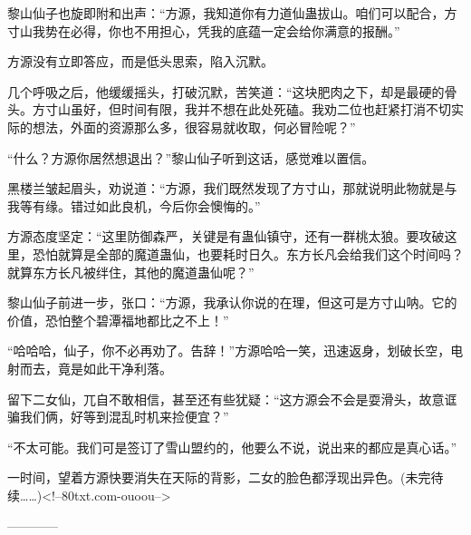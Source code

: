 \begin{this_body}
黎山仙子也旋即附和出声：“方源，我知道你有力道仙蛊拔山。咱们可以配合，方寸山我势在必得，你也不用担心，凭我的底蕴一定会给你满意的报酬。”

方源没有立即答应，而是低头思索，陷入沉默。

几个呼吸之后，他缓缓摇头，打破沉默，苦笑道：“这块肥肉之下，却是最硬的骨头。方寸山虽好，但时间有限，我并不想在此处死磕。我劝二位也赶紧打消不切实际的想法，外面的资源那么多，很容易就收取，何必冒险呢？”

“什么？方源你居然想退出？”黎山仙子听到这话，感觉难以置信。

黑楼兰皱起眉头，劝说道：“方源，我们既然发现了方寸山，那就说明此物就是与我等有缘。错过如此良机，今后你会懊悔的。”

方源态度坚定：“这里防御森严，关键是有蛊仙镇守，还有一群桃太狼。要攻破这里，恐怕就算是全部的魔道蛊仙，也要耗时日久。东方长凡会给我们这个时间吗？就算东方长凡被绊住，其他的魔道蛊仙呢？”

黎山仙子前进一步，张口：“方源，我承认你说的在理，但这可是方寸山呐。它的价值，恐怕整个碧潭福地都比之不上！”

“哈哈哈，仙子，你不必再劝了。告辞！”方源哈哈一笑，迅速返身，划破长空，电射而去，竟是如此干净利落。

留下二女仙，兀自不敢相信，甚至还有些犹疑：“这方源会不会是耍滑头，故意诓骗我们俩，好等到混乱时机来捡便宜？”

“不太可能。我们可是签订了雪山盟约的，他要么不说，说出来的都应是真心话。”

一时间，望着方源快要消失在天际的背影，二女的脸色都浮现出异色。(未完待续……)<!--80txt.com-ouoou-->

------------

\end{this_body}

